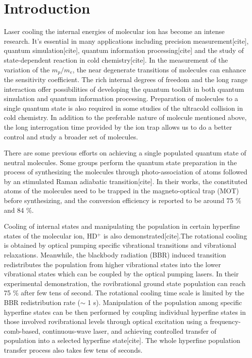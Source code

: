 \documentclass[aip,jcp,reprint]{revtex4-1}
\begin{document}
\section{Introduction}
Laser cooling the internal energies of molecular ion has become an intense research. It's essential in many applications including precision measurement[cite], quantum simulation[cite], quantum information processing[cite] and the study of state-dependent reaction in cold chemistry[cite]. In the measurement of the variation of the $m_p/m_e$, the near degenerate transitions of molecules can enhance the sensitivity coefficient. The rich internal degrees of freedom and the long range interaction offer possibilities of developing the quantum toolkit in both quantum simulation and quantum information processing. Preparation of molecules to a single quantum state is also required in some studies of the ultracold collision in cold chemistry. In addition to the preferable nature of molecule mentioned above, the long interrogation time provided by the ion trap allows us to do a better control and study a broader set of molecules.\par
There are some previous efforts on achieving a single populated quantum state of neutral molecules. Some groups perform the quantum state preparation in the process of synthesizing the molecules through photo-association of atoms followed by an stimulated Raman adiabatic transition[cite]. In their works, the constituted atoms of the molecules need to be trapped in the magneto-optical trap (MOT) before synthesizing, and the conversion efficiency is reported to be around 75 $\%$ and 84 $\%$.\par

Cooling of internal states and manipulating the population in certain hyperfine states of the molecular ion, HD$^+$ is also demonstrated[cite].The rotational cooling is obtained by optical pumping specific vibrational transitions and vibrational relaxations. Meanwhile, the blackbody radiation (BBR) induced transition redistributes the population from higher vibrational states into the lower vibrational states which can be coupled by the optical pumping lasers. In their experimental demonstration, the rovibrational ground state population can reach 75 $\%$ after few tens of second. The rotational cooling time scale is limited by the BBR redistribution rate ($\sim$ 1 s). Manipulation of the population among specific hyperfine states can be then performed by coupling individual hyperfine states in those involved rovibrational levels through optical excitation using a frequency-comb-based, continuous-wave laser, and achieving controlled transfer of population into a selected hyperfine state[cite]. The whole hyperfine population transfer process also takes few tens of seconds.\par
\end{document}

